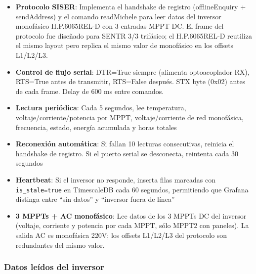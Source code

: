 \documentclass[12pt,a4paper]{article}
\begin{document}
\begin{itemize}
    \item \textbf{Protocolo SISER}: Implementa el handshake de registro (offlineEnquiry + sendAddress) y el comando readMichele para leer datos del inversor monof\'asico H.P.6065REL-D con 3 entradas MPPT DC. El frame del protocolo fue dise\~nado para SENTR 3/3 trif\'asico; el H.P.6065REL-D reutiliza el mismo layout pero replica el mismo valor de monof\'asico en los offsets L1/L2/L3.
    \item \textbf{Control de flujo serial}: DTR=True siempre (alimenta optoacoplador RX), RTS=True antes de transmitir, RTS=False despu\'es. STX byte (0x02) antes de cada frame. Delay de 600 ms entre comandos.
    \item \textbf{Lectura peri\'odica}: Cada 5 segundos, lee temperatura, voltaje/corriente/potencia por MPPT, voltaje/corriente de red monof\'asica, frecuencia, estado, energ\'ia acumulada y horas totales
    \item \textbf{Reconexi\'on autom\'atica}: Si fallan 10 lecturas consecutivas, reinicia el handshake de registro. Si el puerto serial se desconecta, reintenta cada 30 segundos
    \item \textbf{Heartbeat}: Si el inversor no responde, inserta filas marcadas con \texttt{is\_stale=true} en TimescaleDB cada 60 segundos, permitiendo que Grafana distinga entre ``sin datos'' y ``inversor fuera de l\'inea''
    \item \textbf{3 MPPTs + AC monof\'asico}: Lee datos de los 3 MPPTs DC del inversor (voltaje, corriente y potencia por cada MPPT, s\'olo MPPT2 con paneles). La salida AC es monof\'asica 220V; los offsets L1/L2/L3 del protocolo son redundantes del mismo valor.
\end{itemize}

\subsubsection{Datos le\'idos del inversor}
\end{document}
